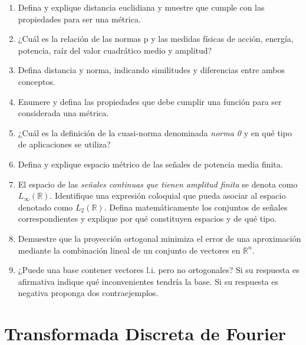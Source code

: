 \documentclass[a4paper,10pt,spanish]{article}
\begin{document}
\begin{enumerate}

\item Defina y explique distancia euclidiana y muestre que cumple con las propiedades para ser una métrica.

\item ¿Cuál es la relación de las normas p y las medidas físicas de acción, energía, potencia, raíz del valor cuadrático medio y amplitud?

\item Defina distancia y norma, indicando similitudes y diferencias entre ambos conceptos.

\item Enumere y defina las propiedades que debe cumplir una función para ser considerada una métrica.

\item  ¿Cuál es la definición de la cuasi-norma denominada \textit{norma 0} y en qué tipo de aplicaciones se utiliza?

\item Defina y explique espacio métrico de las señales de potencia media finita.

\item El espacio de las \textit{señales continuas que tienen amplitud finita} se denota como $L_{\infty}(\mathbb{R})$. Identifique una expresión coloquial que pueda asociar al espacio denotado como $L_{2}(\mathbb{R})$. Defina matemáticamente los conjuntos de señales correspondientes y explique por qué constituyen espacios y de qué tipo.

\item  Demuestre que la proyección ortogonal minimiza el error de una aproximación mediante la combinación lineal de un conjunto de vectores en $\mathbb{R}^{n}$.

\item ¿Puede una base contener vectores l.i. pero no ortogonales? Si su respuesta es afirmativa indique qué inconvenientes tendría la base. Si su respuesta es negativa proponga dos contraejemplos.

\end{enumerate}

\section{Transformada Discreta de Fourier}
\end{document}
